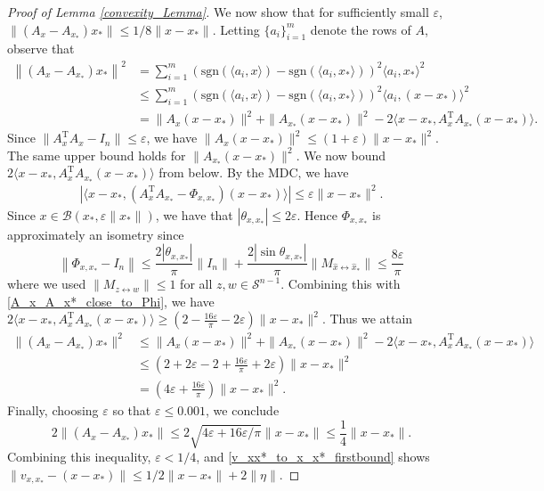 \documentclass[11pt]{article}
\newcommand{\one}{\operatorname{\mathbbm{1}}}
\newcommand{\Scal}{\mathcal{S}}
\newcommand{\T}{\mathrm{T}}
\renewcommand{\top}{\mathrm{T}}
\newcommand{\sgn}{\text{sgn}}
\renewcommand{\epsilon}{\varepsilon}
\newcommand{\Bcal}{\mathcal{B}}
\begin{document}
\begin{proof}[Proof of Lemma \ref{convexity_Lemma}]
We now show that for sufficiently small $\epsilon$, $\|(A_x - A_{x_*})x_*\|\leqslant 1/8\|x-x_*\|$. Letting $\{a_i\}_{i=1}^m$ denote the rows of $A$, observe that \begin{align*}
    \left\|(A_{x} - A_{x_*})x_*\right\|^2
    & = \sum_{i=1}^m\left(\sgn(\langle a_i, x\rangle) - \sgn(\langle a_i , x_*\rangle )\right)^2\langle a_i, x_*\rangle^2 \\
    & \leqslant \sum_{i=1}^m\left(\sgn(\langle a_i, x\rangle) - \sgn(\langle a_i , x_*\rangle)\right)^2\langle a_i, (x -x_*)\rangle^2 \\
    & = \|A_{x}(x - x_*)\|^2 + \|A_{x_*}(x - x_*)\|^2 - 2\langle x - x_*,A_{x}^\top A_{x_*}(x - x_*)\rangle. 
\end{align*} Since $\|A_x^{\T}A_x-I_n\|\leqslant \epsilon$, we have $\|A_x(x-x_*)\|^2 \leqslant (1+\epsilon)\|x-x_*\|^2$. The same upper bound holds for $\|A_{x_*}(x-x_*)\|^2.$ We now bound $2\langle x - x_*,A_{x}^\top A_{x_*}(x - x_*)\rangle$ from below. By the MDC, we have \begin{align}
     |\langle x - x_*,(A_{x}^\top A_{x_*} - \Phi_{x,x_*})(x - x_*)\rangle| \leqslant \epsilon \|x - x_*\|^2. \label{A_x_A_x*_close_to_Phi}
\end{align} Since $x \in \Bcal(x_*,\epsilon\|x_*\|)$, we have that $|\theta_{x,x_*}|\leqslant2\epsilon$. Hence $\Phi_{x,x_*}$ is approximately an isometry since $$\left\|\Phi_{x,x_*} - I_n\right\|  \leqslant \frac{2|\theta_{x,x_*}|}{\pi}\|I_n\| + \frac{2|\sin \theta_{x,x_*}|}{\pi}\|M_{\hat{x} \leftrightarrow \hat{x}_{*}}\| \leqslant \frac{8\epsilon}{\pi}$$ where we used $\|M_{z\leftrightarrow w}\| \leqslant 1$ for all $z,w \in \Scal^{n-1}$. Combining this with \eqref{A_x_A_x*_close_to_Phi}, we have $2\langle x - x_*,A_{x}^\top A_{x_*}(x - x_*)\rangle \geqslant \left(2 - \frac{16\epsilon}{\pi}- 2\epsilon\right)\|x - x_*\|^2.$ Thus we attain
    \begin{align*}
        \|(A_x - A_{x_*})x_*\|^2 &\leqslant  \|A_{x}(x - x_*)\|^2 + \|A_{x_*}(x - x_*)\|^2 - 2\langle x - x_*,A_{x}^\top A_{x_*}(x - x_*)\rangle \\
        & \leqslant \left(2 + 2\epsilon -2 +\frac{16\epsilon}{\pi}+ 2\epsilon \right)\|x-x_*\|^2 \\
        & = \left(4\epsilon + \frac{16\epsilon}{\pi}\right)\|x-x_*\|^2.
    \end{align*} Finally, choosing $\epsilon$ so that $\epsilon \leqslant 0.001$, we conclude  $$2\|(A_x-A_{x_*})x_*\|\leqslant2\sqrt{4\epsilon + 16\epsilon/\pi}\|x-x_*\|\leqslant \frac{1}{4}\|x-x_*\|.$$ Combining this inequality, $\epsilon < 1/4$, and \eqref{v_xx*_to_x_x*_firstbound} shows $\|v_{x,x_*} - (x-x_*)\|\leqslant 1/2\|x-x_*\| + 2\|\eta\|$. 
    

\end{proof}
\end{document}
